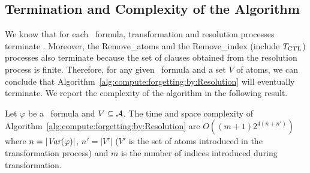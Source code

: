 \documentclass[twoside,11pt]{article}
\begin{document}
%
%
%
%


 


\subsection{Termination and Complexity of the Algorithm}
We  know that for each \CTL\ formula,  transformation and resolution processes terminate \cite{zhang2014resolution}. Moreover, the Remove\_atoms and the Remove\_index (include $T_{\textrm{CTL}}$) processes also terminate because the set of clauses obtained from the resolution process is finite. Therefore, for any given \CTL\ formula and a set $V$ of atoms, we can conclude that  Algorithm~\ref{alg:compute:forgetting:by:Resolution} will eventually terminate.
We report the complexity of the algorithm in the following result.


\begin{proposition}\label{pro:complexity}
	Let $\varphi$ be a \CTL\ formula and $V \subseteq {\cal A}$.
	The time and space complexity of Algorithm~\ref{alg:compute:forgetting:by:Resolution} are $O((m+1)2^{4(n+n')})$ where $n=|\textit{Var}(\varphi)|$, $n'=|V'|$ ($V'$ is the set of atoms introduced in the transformation process) and $m$ is the number of indices introduced during transformation.
\end{proposition}
\end{document}

